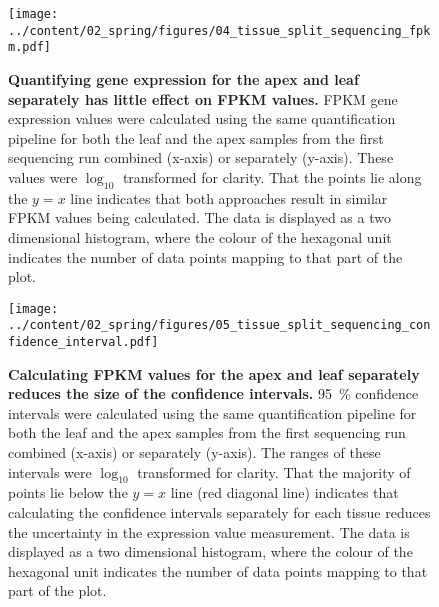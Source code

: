 \documentclass[12pt,]{book}
\begin{document}
\begin{figure}[htbp]
\centering
\texttt{[image: ../content/02\_spring/figures/04\_tissue\_split\_sequencing\_fpkm.pdf]}
\caption{\textbf{Quantifying gene expression for the apex and leaf
separately has little effect on FPKM values.} FPKM gene expression
values were calculated using the same quantification pipeline for both
the leaf and the apex samples from the first sequencing run combined
(x-axis) or separately (y-axis). These values were \(\log_{10}\)
transformed for clarity. That the points lie along the \(y = x\) line
indicates that both approaches result in similar FPKM values being
calculated. The data is displayed as a two dimensional histogram, where
the colour of the hexagonal unit indicates the number of data points
mapping to that part of the plot.}\label{figure:204:tissuesplitfpkm}
\end{figure}

\begin{figure}[htbp]
\centering
\texttt{[image: ../content/02\_spring/figures/05\_tissue\_split\_sequencing\_confidence\_interval.pdf]}
\caption{\textbf{Calculating FPKM values for the apex and leaf
separately reduces the size of the confidence intervals.} 95~\%
confidence intervals were calculated using the same quantification
pipeline for both the leaf and the apex samples from the first
sequencing run combined (x-axis) or separately (y-axis). The ranges of
these intervals were \(\log_{10}\) transformed for clarity. That the
majority of points lie below the \(y = x\) line (red diagonal line)
indicates that calculating the confidence intervals separately for each
tissue reduces the uncertainty in the expression value measurement. The
data is displayed as a two dimensional histogram, where the colour of
the hexagonal unit indicates the number of data points mapping to that
part of the plot.}\label{figure:205:tissuesplitconf}
\end{figure}
\end{document}
